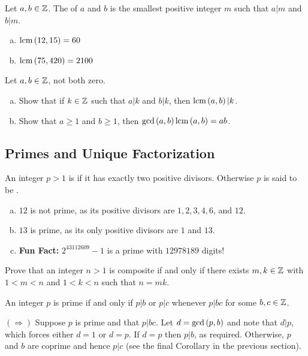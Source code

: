 \documentclass[11pt,fleqn,dvipsnames,usenames]{article}
\begin{document}
 Let $a,b\in\mathbb{Z}$.  The  of $a$ and $b$ is the smallest positive integer $m$ such that $a|m$ and $b|m$.
\vsp

\examples
\begin{enumerate}[(a)]
\item $\text{lcm}\left(12, 15\right) = 60$
\item $\text{lcm}\left(75, 420\right) = 2100$ 
\end{enumerate}
\vsp

\exercises Let $a,b\in\mathbb{Z}$, not both zero.
\begin{enumerate}[(a)]
\item Show that if $k\in\mathbb{Z}$ such that $a|k$ and $b|k$, then $\text{lcm}\left(a, b\right)|k$.
\item Show that $a\geq 1$ and $b\geq 1$, then $\text{gcd}\left(a, b\right)\text{lcm}\left(a, b\right) = ab$.
\end{enumerate}
\vsp

\subsection{Primes and Unique Factorization}

 An integer $p > 1$ is  if it has exactly two positive divisors.  Otherwise $p$ is said to be .
\vsp

\examples
\begin{enumerate}[(a)]
\item $12$ is not prime, as its positive divisors are $1, 2, 3, 4, 6$, and $12$.
\item $13$ is prime, as its only positive divisors are $1$ and $13$.
\item \textbf{Fun Fact:} $2^{43112609} - 1$ is a prime with $12978189$ digits!
\end{enumerate}
\vsp

\begin{exercise}
Prove that an integer $n>1$ is composite if and only if there exists $m,k\in\mathbb{Z}$ with $1 < m < n$ and $1 < k < n$ such that $n = mk$.
\end{exercise}

\thm An integer $p$ is prime if and only if $p|b$ or $p|c$ whenever $p|bc$ for some $b,c\in\mathbb{Z}$.
\vsp

\prf $(\Rightarrow)$ Suppose $p$ is prime and that $p|bc$.  Let $d = \text{gcd}\left(p,b\right)$ and note that $d|p$, which forces either $d = 1$ or $d = p$.  If $d = p$ then $p|b$, as required.  Otherwise, $p$ and $b$ are coprime and hence $p|c$ (see the final Corollary in the previous section).
\vsp
\end{document}

